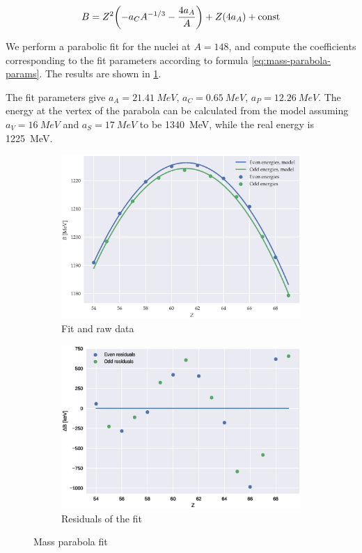 \documentclass[main.tex]{subfiles}
\begin{document}
\begin{equation} \label{eq:mass-parabola-params}
    B = Z^2 \qty(-a_C A^{-1/3} - \frac{4 a_A}{A}) + Z\qty(4a_A) + \text{const}
\end{equation}

\begin{bluebox}
  We perform a parabolic fit for the nuclei at \(A = 148\), and compute the coefficients corresponding to the fit parameters according to formula \eqref{eq:mass-parabola-params}. The results are shown in \ref{fig:mass-parabola-fit}.

  The fit parameters give \(a_A = \SI{21.41}{MeV}\), \(a_C = \SI{0.65}{MeV}\), \(a_P = \SI{12.26}{MeV}\). The energy at the vertex of the parabola can be calculated from the model assuming \(a_V = \SI{16}{MeV}\) and \(a_S = \SI{17}{MeV}\) to be \SI{1340}{MeV}, while the real energy is  \SI{1225}{MeV}.
\end{bluebox}

\begin{figure}[H]
  \centering
  \begin{subfigure}{0.5\textwidth}
      \includegraphics[width=\textwidth]{figures/parabolic_fits.eps}
      \caption{Fit and raw data}
  \end{subfigure}%
  \begin{subfigure}{0.5\textwidth}
      \includegraphics[width=\textwidth]{figures/residuals.eps}
      \caption{Residuals of the fit}
  \end{subfigure}
  \caption{Mass parabola fit}
  \label{fig:mass-parabola-fit}
\end{figure}
\end{document}
